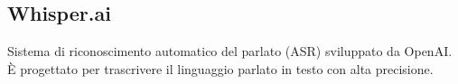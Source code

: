 \hypertarget{sec:whisper.ai}{}
\subsection*{Whisper.ai}
Sistema di riconoscimento automatico del parlato (ASR) sviluppato da OpenAI.
È progettato per trascrivere il linguaggio parlato in testo con alta precisione.

\newpage



\begin{comment}

\fancyhead[L]{X} %

\section{}

\dots

\newpage


\fancyhead[L]{Y} %

\section{}

\dots

\newpage


\fancyhead[L]{Z} %

\section{}

\dots

\end{comment}
